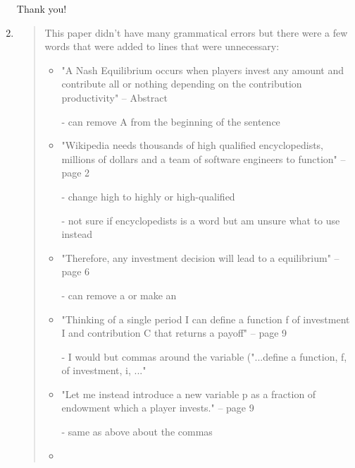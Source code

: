 \documentclass{article}
\newenvironment{itquote}
	{\begin{quote}\itshape}
	{\end{quote}\ignorespacesafterend}
\begin{document}
\begin{enumerate}
\begin{itquote}
				\end{itquote}

				Thank you!

			\item

				\begin{itquote}

					This paper didn't have many grammatical errors but there were a few words that were added to lines that were unnecessary:

					\begin{itemize}
						\item 

							"A Nash Equilibrium occurs when players invest any amount and contribute all or nothing depending on the contribution productivity" – Abstract

							- can remove A from the beginning of the sentence

						\item

							"Wikipedia needs thousands of high qualified encyclopedists, millions of dollars and a team of software engineers to function" – page 2
							
							- change high to highly or high-qualified
	
							- not sure if encyclopedists is a word but am unsure what to use instead

						\item
							
							"Therefore, any investment decision will lead to a equilibrium" – page 6
							
							- can remove a or make an

						\item
						
							"Thinking of a single period I can define a function f of investment I and contribution C that returns a payoff" – page 9
							
							- I would but commas around the variable ("...define a function, f, of investment, i, ..."

						\item
							
							"Let me instead introduce a new variable p as a fraction of endowment which a player invests." – page 9
						
							- same as above about the commas

						\item


\end{itemize}
\end{itquote}
\end{enumerate}
\end{document}
